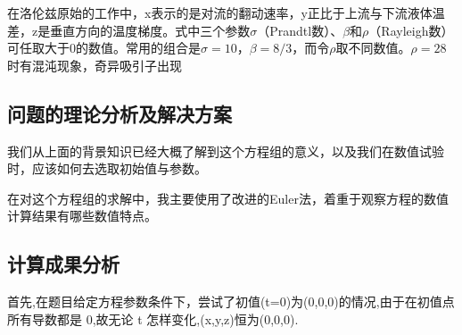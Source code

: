 \documentclass[10pt,a4paper]{ctexart}
\begin{document}
在洛伦兹原始的工作中，x表示的是对流的翻动速率，y正比于上流与下流液体温差，z是垂直方向的温度梯度。式中三个参数$\sigma$（Prandtl数）、$\beta$和$\rho$（Rayleigh数）可任取大于0的数值。常用的组合是$\sigma=10$，$\beta=8/3$，而令$\rho$取不同数值。$\rho=28$时有混沌现象，奇异吸引子出现

\subsection{问题的理论分析及解决方案}
我们从上面的背景知识已经大概了解到这个方程组的意义，以及我们在数值试验时，应该如何去选取初始值与参数。

在对这个方程组的求解中，我主要使用了改进的Euler法，着重于观察方程的数值计算结果有哪些数值特点。
\subsection{计算成果分析}
首先,在题目给定方程参数条件下，尝试了初值(t=0)为(0,0,0)的情况,由于在初值点所有导数都是 0,故无论 t 怎样变化,(x,y,z)恒为(0,0,0).
\end{document}
